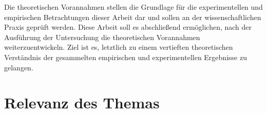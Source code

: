 Die theoretischen Vorannahmen stellen die Grundlage für die experimentellen und empirischen Betrachtungen dieser Arbeit dar und sollen an der wissenschaftlichen Praxis geprüft werden. Diese Arbeit soll es abschließend ermöglichen, nach der Ausführung der Untersuchung die theoretischen Vorannahmen weiterzuentwickeln. Ziel ist es, letztlich zu einem vertieften theoretischen Verständnis der gesammelten empirischen und experimentellen Ergebnisse zu gelangen. 

\section{Relevanz des Themas} 

